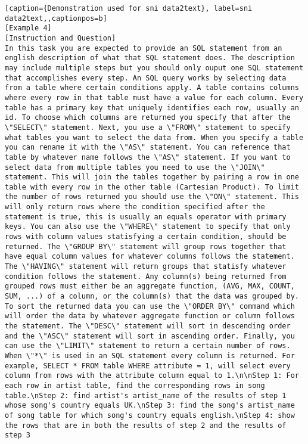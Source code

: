\begin{lstlisting}[caption={Demonstration used for sni data2text}, label=sni data2text,,captionpos=b]
[Example 4]
[Instruction and Question]
In this task you are expected to provide an SQL statement from an english description of what that SQL statement does. The description may include multiple steps but you should only ouput one SQL statement that accomplishes every step. An SQL query works by selecting data from a table where certain conditions apply. A table contains columns where every row in that table must have a value for each column. Every table has a primary key that uniquely identifies each row, usually an id. To choose which columns are returned you specify that after the \"SELECT\" statement. Next, you use a \"FROM\" statement to specify what tables you want to select the data from. When you specify a table you can rename it with the \"AS\" statement. You can reference that table by whatever name follows the \"AS\" statement. If you want to select data from multiple tables you need to use the \"JOIN\" statement. This will join the tables together by pairing a row in one table with every row in the other table (Cartesian Product). To limit the number of rows returned you should use the \"ON\" statement. This will only return rows where the condition specified after the statement is true, this is usually an equals operator with primary keys. You can also use the \"WHERE\" statement to specify that only rows with column values statisfying a certain condition, should be returned. The \"GROUP BY\" statement will group rows together that have equal column values for whatever columns follows the statement. The \"HAVING\" statement will return groups that statisfy whatever condition follows the statement. Any column(s) being returned from grouped rows must either be an aggregate function, (AVG, MAX, COUNT, SUM, ...) of a column, or the column(s) that the data was grouped by. To sort the returned data you can use the \"ORDER BY\" command which will order the data by whatever aggregate function or column follows the statement. The \"DESC\" statement will sort in descending order and the \"ASC\" statement will sort in ascending order. Finally, you can use the \"LIMIT\" statement to return a certain number of rows. When \"*\" is used in an SQL statement every column is returned. For example, SELECT * FROM table WHERE attribute = 1, will select every column from rows with the attribute column equal to 1.\n\nStep 1: For each row in artist table, find the corresponding rows in song table.\nStep 2: find artist's artist_name of the results of step 1 whose song's country equals UK.\nStep 3: find the song's artist_name of song table for which song's country equals english.\nStep 4: show the rows that are in both the results of step 2 and the results of step 3


\end{lstlisting}
